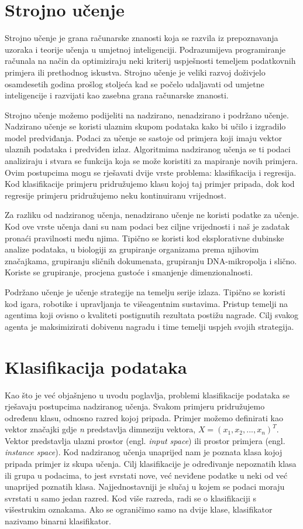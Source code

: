 \documentclass[times, utf8, zavrsni]{fer}
\begin{document}
\section{Strojno učenje}
Strojno učenje je grana računarske znanosti koja se razvila iz prepoznavanja uzoraka i teorije učenja u umjetnoj inteligenciji. Podrazumijeva programiranje računala na način da optimiziraju neki kriterij uspješnosti temeljem podatkovnih primjera ili prethodnog iskustva. Strojno učenje je veliki razvoj doživjelo osamdesetih godina prošlog stoljeća kad se počelo udaljavati od umjetne inteligencije i razvijati kao zasebna grana računarske znanosti.

Strojno učenje možemo podijeliti na nadzirano, nenadzirano i podržano učenje. Nadzirano učenje se koristi ulaznim skupom podataka kako bi učilo i izgradilo model predviđanja. Podaci za učenje se sastoje od primjera koji imaju vektor ulaznih podataka i predviđen izlaz. Algoritmima nadziranog učenja se ti podaci analiziraju i stvara se funkcija koja se može koristiti za mapiranje novih primjera. Ovim postupcima mogu se rješavati dvije vrste problema: klasifikacija i regresija. Kod klasifikacije primjeru pridružujemo klasu kojoj taj primjer pripada, dok kod regresije primjeru pridružujemo neku kontinuiranu vrijednost.

Za razliku od nadziranog učenja, nenadzirano učenje ne koristi podatke za učenje. Kod ove vrste učenja dani su nam podaci bez ciljne vrijednosti i naš je zadatak pronaći pravilnosti među njima. Tipično se koristi kod eksplorativne dubinske analize podataka, u biologiji za grupiranje organizama prema njihovim značajkama, grupiranju sličnih dokumenata, grupiranju DNA-mikropolja i slično. Koriste se grupiranje, procjena gustoće i smanjenje dimenzionalnosti.

Podržano učenje je učenje strategije na temelju serije izlaza. Tipično se koristi kod igara, robotike i upravljanja te višeagentnim sustavima. Pristup temelji na agentima koji ovisno o kvaliteti postignutih rezultata postižu nagrade. Cilj svakog agenta je maksimizirati dobivenu nagradu i time temelji uspjeh svojih strategija. 

\section{Klasifikacija podataka}

Kao što je već objašnjeno u uvodu poglavlja, problemi klasifikacije podataka se rješavaju postupcima nadziranog učenja. Svakom primjeru pridružujemo određenu klasu, odnosno razred kojoj pripada. Primjer možemo definirati kao vektor značajki gdje \textit{n} predstavlja dimneziju vektora, $X = (x_1, x_2,..., x_n)^T$. Vektor predstavlja ulazni prostor (engl. \textit{input space}) ili prostor primjera (engl. \textit{instance space}). Kod nadziranog učenja unaprijed nam je poznata klasa kojoj pripada primjer iz skupa učenja. Cilj klasifikacije je određivanje nepoznatih klasa ili grupa u podacima, to jest svrstati nove, već neviđene podatke u neki od već unaprijed poznatih klasa. Najjednostavniji je slučaj u kojem se podaci moraju svrstati u samo jedan razred. Kod više razreda, radi se o klasifikaciji s višestrukim oznakama. Ako se ograničimo samo na dvije klase, klasifikator nazivamo binarni klasifikator. 
\end{document}
